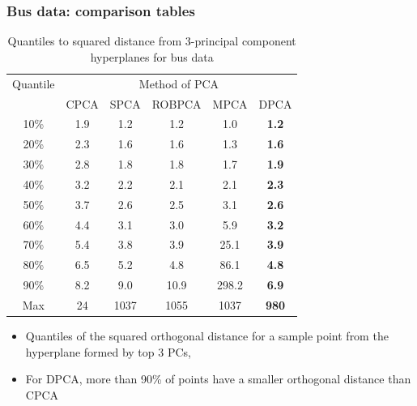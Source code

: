 \documentclass[handout,10pt]{beamer}
\begin{document}
\begin{frame}
\frametitle{Bus data: comparison tables}

\begin{footnotesize}
\begin{table}[t]
\centering
    \begin{tabular}{c|ccccc}
    \hline
    Quantile & \multicolumn{5}{c}{Method of PCA}         \\ \cline{2-6}
    ~                   & CPCA     & SPCA & ROBPCA & MPCA & DPCA \\\hline 
    10\%      & 1.9       & 1.2       & 1.2    & 1.0       & \textbf{1.2}       \\
    20\%      & 2.3       & 1.6       & 1.6    & 1.3       & \textbf{1.6}       \\
    30\%      & 2.8       & 1.8       & 1.8    & 1.7       & \textbf{1.9}       \\
    40\%      & 3.2       & 2.2       & 2.1    & 2.1       & \textbf{2.3}       \\
    50\%      & 3.7       & 2.6       & 2.5    & 3.1       & \textbf{2.6}       \\
    60\%      & 4.4       & 3.1       & 3.0    & 5.9       & \textbf{3.2}       \\
    70\%      & 5.4       & 3.8       & 3.9    & 25.1      & \textbf{3.9}       \\
    80\%      & 6.5       & 5.2       & 4.8    & 86.1      & \textbf{4.8}       \\
    90\%      & 8.2       & 9.0       & 10.9   & 298.2     & \textbf{6.9}      \\
    Max       & 24        & 1037      & 1055   & 1037      & \textbf{980}      \\\hline
    \end{tabular}
    \caption{Quantiles to squared distance from 3-principal component hyperplanes for bus data}
    \label{table:bus_table2}
\end{table}
\end{footnotesize}

\begin{itemize}
\item Quantiles of the squared orthogonal distance for a sample point from the hyperplane formed by top 3 PCs,
\vspace{.2cm}
\item For DPCA, more than 90\% of points have a smaller orthogonal distance than CPCA
\end{itemize}
\end{frame}
\end{document}
